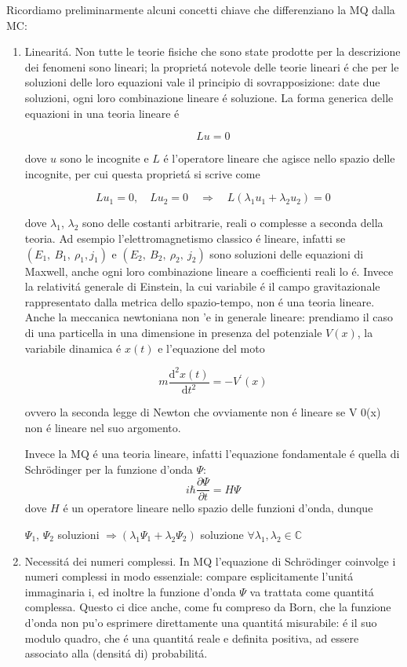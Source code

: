 \documentclass[a4paper]{article}
\numberwithin{equation}{section}
\begin{document}
Ricordiamo preliminarmente alcuni concetti chiave che differenziano la MQ dalla MC:
\begin{enumerate}
\item Linearit\'a. Non tutte le teorie fisiche che sono state prodotte per la descrizione dei fenomeni sono lineari; la propriet\'a notevole delle teorie lineari \'e che per le soluzioni delle loro equazioni vale il principio di sovrapposizione: date due soluzioni, ogni loro combinazione lineare \'e soluzione. La forma generica delle equazioni in una teoria lineare \'e 

$$Lu = 0$$ 

dove $u$ sono le incognite e $L$ \'e l'operatore lineare che agisce nello spazio delle incognite, per cui questa propriet\'a si scrive come

$$L u_{1}=0,\quad L u_{2}=0\quad\Longrightarrow\quad L(\lambda_{1}u_{1}+\lambda_{2}u_{2})=0$$

dove $\lambda_{1}$, $\lambda_{2}$ sono delle costanti arbitrarie, reali o complesse a seconda della teoria. Ad esempio l'elettromagnetismo classico \'e lineare, infatti se $(E_{1}, \ B_{1}, \ \rho_{1}, j_{1})$ e $(E_{2}, \ B_2, \ \rho_{2}, \ j_2)$ sono soluzioni delle equazioni di Maxwell, anche ogni loro combinazione lineare a coefficienti reali lo \'e. Invece la relativit\'a generale di Einstein, la cui variabile \'e il campo gravitazionale rappresentato dalla metrica dello spazio-tempo, non \'e una teoria lineare. Anche la meccanica newtoniana non 'e in generale lineare: prendiamo il caso di una particella in una dimensione in presenza del potenziale $V (x)$, la variabile dinamica \'e $x(t)$ e l'equazione del moto

$$m{\frac{\mathrm{d}^{2}x(t)}{\mathrm{d}t^{2}}}=-V^{\prime}(x)$$

ovvero la seconda legge di Newton che ovviamente non \'e lineare se V
0(x) non \'e lineare nel suo argomento.

Invece la MQ \'e una teoria lineare, infatti l'equazione fondamentale \'e quella di Schr\"odinger per la funzione d'onda $\Psi$:
$$i\hbar{\frac{\partial\Psi}{\partial t}}=H\Psi$$
dove $H$ \'e un operatore lineare nello spazio delle funzioni d'onda, dunque 

\begin{center}
$\Psi_{1}$, $\Psi_{2}$ soluzioni $\Rightarrow (\lambda_{1}\Psi_{1} + \lambda_{2}\Psi_{2})$ soluzione $\forall \lambda_{1}, \lambda_{2} \in \mathbb{C}$
\end{center}

\item Necessit\'a dei numeri complessi. In MQ l'equazione di Schr\"odinger coinvolge i numeri complessi in modo essenziale: compare esplicitamente l'unit\'a immaginaria i, ed inoltre la funzione d'onda $\Psi$ va trattata come quantit\'a complessa. Questo ci dice anche, come fu compreso da Born, che la funzione d'onda non pu'o esprimere direttamente una quantit\'a misurabile: \'e il suo modulo quadro, che \'e una quantit\'a reale e definita positiva, ad essere associato alla (densit\'a di) probabilit\'a.


\end{enumerate}
\end{document}
